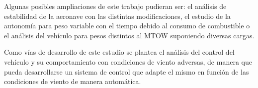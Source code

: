 Algunas posibles ampliaciones de este trabajo pudieran ser: el análisis de estabilidad de la aeronave con las distintas modificaciones, el estudio de la autonomía para peso variable con el tiempo debido al consumo de combustible o el análisis del vehículo para pesos distintos al MTOW suponiendo diversas cargas.

Como vías de desarrollo de este estudio se plantea el análisis del control del vehículo y su comportamiento con condiciones de viento adversas, de manera que pueda desarrollarse un sistema de control que adapte el mismo en función de las condiciones de viento de manera automática.
